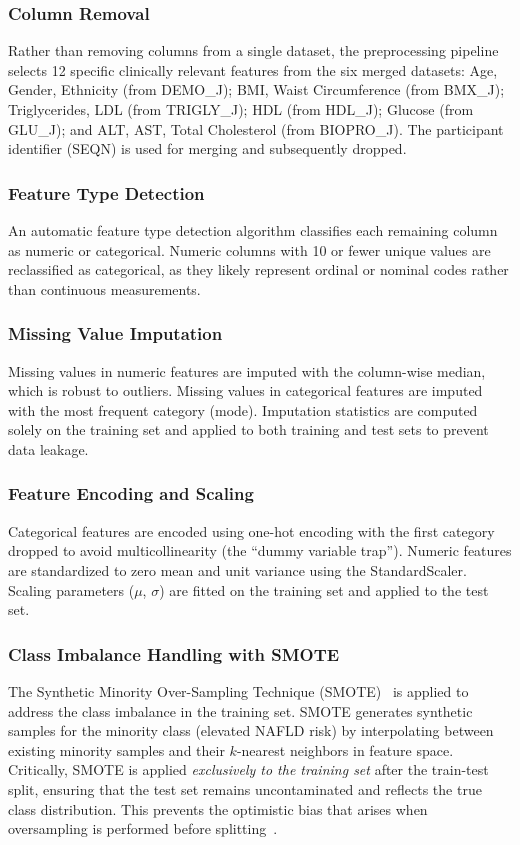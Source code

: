 \documentclass[conference,10pt]{IEEEtran}
\begin{document}
\subsubsection{Column Removal}
Rather than removing columns from a single dataset, the preprocessing pipeline selects 12 specific clinically relevant features from the six merged datasets: Age, Gender, Ethnicity (from DEMO\_J); BMI, Waist Circumference (from BMX\_J); Triglycerides, LDL (from TRIGLY\_J); HDL (from HDL\_J); Glucose (from GLU\_J); and ALT, AST, Total Cholesterol (from BIOPRO\_J). The participant identifier (SEQN) is used for merging and subsequently dropped.

\subsubsection{Feature Type Detection}
An automatic feature type detection algorithm classifies each remaining column as numeric or categorical. Numeric columns with 10 or fewer unique values are reclassified as categorical, as they likely represent ordinal or nominal codes rather than continuous measurements.

\subsubsection{Missing Value Imputation}
Missing values in numeric features are imputed with the column-wise median, which is robust to outliers. Missing values in categorical features are imputed with the most frequent category (mode). Imputation statistics are computed solely on the training set and applied to both training and test sets to prevent data leakage.

\subsubsection{Feature Encoding and Scaling}
Categorical features are encoded using one-hot encoding with the first category dropped to avoid multicollinearity (the ``dummy variable trap''). Numeric features are standardized to zero mean and unit variance using the StandardScaler. Scaling parameters ($\mu$, $\sigma$) are fitted on the training set and applied to the test set.

\subsubsection{Class Imbalance Handling with SMOTE}
The Synthetic Minority Over-Sampling Technique (SMOTE)~\cite{chawla2002smote} is applied to address the class imbalance in the training set. SMOTE generates synthetic samples for the minority class (elevated NAFLD risk) by interpolating between existing minority samples and their $k$-nearest neighbors in feature space. Critically, SMOTE is applied \textit{exclusively to the training set} after the train-test split, ensuring that the test set remains uncontaminated and reflects the true class distribution. This prevents the optimistic bias that arises when oversampling is performed before splitting~\cite{santos2018cross}.
\end{document}
